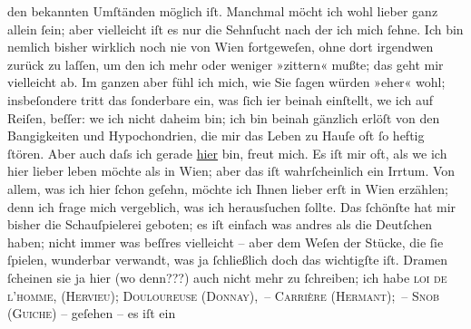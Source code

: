 \begin{ledgroupsized}[t]{13cm}
                    den bekannten Umſtänden möglich iſt. Manchmal möcht ich wohl lieber ganz allein
                    ſein; aber vielleicht iſt {\pb}es nur die Sehnſucht nach
                    der ich mich ſehne. Ich bin nemlich bisher wirklich noch nie von Wien fortgeweſen, ohne dort irgendwen zurück zu laſſen, um
                    den ich mehr oder weniger »zittern« mußte; das geht mir vielleicht ab. Im ganzen
                    aber fühl ich mich, wie Sie ſagen würden »eher« wohl; insbeſondere tritt das
                    ſonderbare ein, was ſich i{\geminationm}er beinah einſtellt,
                    we{\geminationn} ich auf Reiſen, beſſer: we{\geminationn} ich nicht daheim
                    bin; ich bin beinah gänzlich erlöſt von den Bangigkeiten und Hypochondrien, die
                    mir das Leben zu Hauſe oft ſo heftig ſtören. Aber \introOben{}auch\introOben{}
                    daſs ich gerade \uline{hier} bin, freut mich. Es iſt mir
                    oft, als we{\geminationn} ich hier lieber leben möchte als in Wien; aber das iſt wahrſchein{\pb}lich ein
                    Irrtum. Von allem, was ich hier ſchon geſehn, möchte ich Ihnen lieber erſt in
                        Wien erzählen; denn ich frage mich
                    vergeblich, was ich herausſuchen ſollte. Das ſchönſte hat mir bisher die
                    Schauſpielerei geboten; es iſt einfach was andres als die Deutſchen haben; nicht
                    immer was beſſres vielleicht – aber dem Weſen der Stücke, die ſie ſpielen,
                    wunderbar verwandt, was ja ſchließlich doch das wichtigſte iſt. Dramen ſcheinen
                    sie ja hier (wo denn???) auch nicht mehr zu ſchreiben; ich habe \textsc{loi de l’homme, (Hervieu); Douloureuse (Donnay), – Carrière (Hermant); – Snob (Guiche)} – geſehen – es iſt ein

\end{ledgroupsized}
